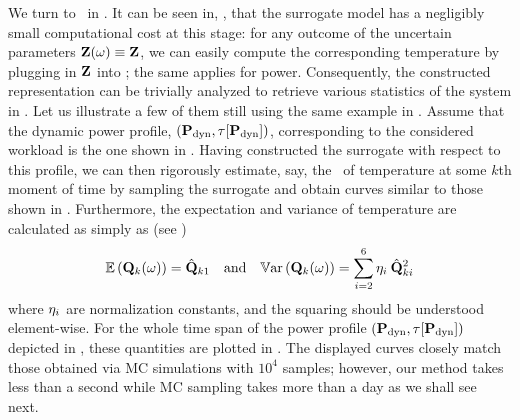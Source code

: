 

We turn to \ in .
It can be seen in, \eg,  that the surrogate model has a negligibly small computational cost at this stage: for any outcome of the uncertain parameters $\mathbf{Z}(\omega) \equiv \mathbf{Z}$, we can easily compute the corresponding temperature by plugging in $\mathbf{Z}$ into ; the same applies for power.
Consequently, the constructed representation can be trivially analyzed to retrieve various statistics of the system in .
Let us illustrate a few of them still using the same example in .
Assume that the dynamic power profile, $\profilePdyn$, corresponding to the considered workload is the one shown in .
Having constructed the surrogate with respect to this profile, we can then rigorously estimate, say, the \pdf\ of temperature at some $k$th moment of time by sampling the surrogate and obtain curves similar to those shown  in .
Furthermore, the expectation and variance of temperature are calculated as simply as (see )
\[
  \mathbb{E}\left(\mathbf{Q}_k(\omega)\right) = \hat{\mathbf{Q}}_{k1} \hspace{1em} \text{and} \hspace{1em} \mathbb{V}\text{ar}\left(\mathbf{Q}_k(\omega)\right) = \sum_{i = 2}^{6} \eta_i \: \hat{\mathbf{Q}}_{ki}^2
\]
where $\eta_i$ are normalization constants, and the squaring should be understood element-wise.
For the whole time span of the power profile $\profilePdyn$ depicted in , these quantities are plotted in .
The displayed curves closely match those obtained via MC simulations with $10^4$ samples; however, our method takes less than a second while MC sampling takes more than a day as we shall see next.
